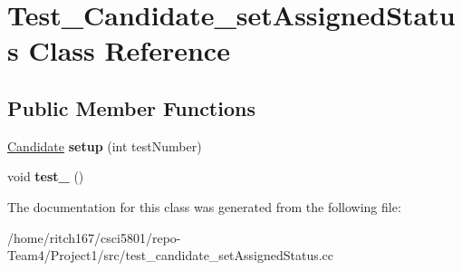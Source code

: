 \hypertarget{classTest__Candidate__setAssignedStatus}{}\section{Test\+\_\+\+Candidate\+\_\+set\+Assigned\+Status Class Reference}
\label{classTest__Candidate__setAssignedStatus}
\subsection*{Public Member Functions}
\begin{DoxyCompactItemize}
\item 
\mbox{\label{classTest__Candidate__setAssignedStatus_aa221c10d22243c5f08fc5e49e74ef3ac}} 
\hyperlink{classCandidate}{Candidate} {\bfseries setup} (int test\+Number)
\item 
\mbox{\label{classTest__Candidate__setAssignedStatus_a149a18a02989f6d00304b285cd8850fe}} 
void {\bfseries test\+\_} ()
\end{DoxyCompactItemize}


The documentation for this class was generated from the following file\+:\begin{DoxyCompactItemize}
\item 
/home/ritch167/csci5801/repo-\/\+Team4/\+Project1/src/test\+\_\+candidate\+\_\+set\+Assigned\+Status.\+cc\end{DoxyCompactItemize}
